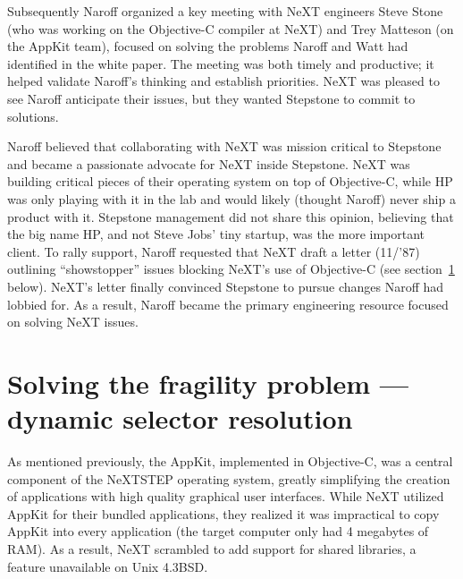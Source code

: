 \documentclass[acmsmall,screen]{acmart}
\begin{document}
Subsequently Naroff organized a key meeting with NeXT engineers Steve Stone (who was working on the Objective-C compiler at NeXT) and Trey Matteson (on the AppKit team), focused on solving the problems Naroff and Watt had identified in the white paper. The meeting was both timely and productive; it helped validate Naroff's thinking and establish priorities. NeXT was pleased to see Naroff anticipate their issues, but they wanted Stepstone to commit to solutions.

Naroff believed that collaborating with NeXT was mission critical to Stepstone and became a passionate advocate for NeXT inside Stepstone. NeXT was building critical pieces of their operating system on top of Objective-C, while HP was only playing with it in the lab and would likely (thought Naroff) never ship a product with it. Stepstone management did not share this opinion, believing that the big name HP, and not Steve Jobs' tiny startup, was the more important client. To rally support, Naroff requested that NeXT draft a letter (11/'87) outlining ``showstopper'' issues blocking NeXT's use of Objective-C (see section~\ref{sec-solvingfragility} below). NeXT's letter finally convinced Stepstone to pursue changes Naroff had lobbied for. As a result, Naroff became the primary engineering resource focused on solving NeXT issues.
\section{Solving the fragility problem --- dynamic selector resolution}
\label{sec-solvingfragility}
As mentioned previously, the AppKit, implemented in Objective-C, was a central component of the NeXTSTEP operating system, greatly simplifying the creation of applications with high quality graphical user interfaces. While NeXT utilized AppKit for their bundled applications, they realized it was impractical to copy AppKit into every application (the target computer only had 4 megabytes of RAM). As a result, NeXT scrambled to add support for shared libraries, a feature unavailable on Unix 4.3BSD. 
\end{document}
